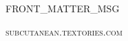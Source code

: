 \thispagestyle{empty}

\vspace*{10\nbs}

\begin{adjustwidth}{4em}{4em}
\begin{parascale}[0.88]
FRONT_MATTER_MSG

\end{parascale}
\end{adjustwidth}

\vspace*{4\nbs}

\begin{center}
\textsc{subcutanean.textories.com}
\end{center}

\cleartorecto


